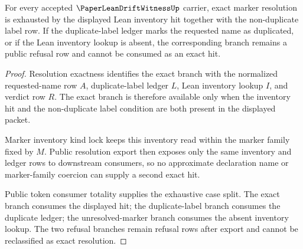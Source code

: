 \begin{theorem}
\label{thm:paper-lean-drift-witness-lean-inventory-hit-exhaustion}
For every accepted $\PaperLeanDriftWitnessUp$ carrier, exact marker resolution is exhausted by the displayed Lean inventory hit together with the non-duplicate label row. If the duplicate-label ledger marks the requested name as duplicated, or if the Lean inventory lookup is absent, the corresponding branch remains a public refusal row and cannot be consumed as an exact hit.
\end{theorem}
\begin{proof}
Resolution exactness identifies the exact branch with the normalized requested-name row $A$, duplicate-label ledger $L$, Lean inventory lookup $I$, and verdict row $R$. The exact branch is therefore available only when the inventory hit and the non-duplicate label condition are both present in the displayed packet.

Marker inventory kind lock keeps this inventory read within the marker family fixed by $M$. Public resolution export then exposes only the same inventory and ledger rows to downstream consumers, so no approximate declaration name or marker-family coercion can supply a second exact hit.

Public token consumer totality supplies the exhaustive case split. The exact branch consumes the displayed hit; the duplicate-label branch consumes the duplicate ledger; the unresolved-marker branch consumes the absent inventory lookup. The two refusal branches remain refusal rows after export and cannot be reclassified as exact resolution.
\end{proof}

